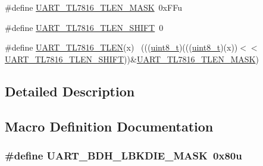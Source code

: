 \begin{DoxyCompactItemize}
\item 
\#define \hyperlink{group___u_a_r_t___register___masks_ga000fb6043015c4cb478d32febfb4a913}{U\+A\+R\+T\+\_\+\+T\+L7816\+\_\+\+T\+L\+E\+N\+\_\+\+M\+A\+SK}~0x\+F\+Fu
\item 
\#define \hyperlink{group___u_a_r_t___register___masks_gaafcee96c5728fbbbc56c3b2ea55bd753}{U\+A\+R\+T\+\_\+\+T\+L7816\+\_\+\+T\+L\+E\+N\+\_\+\+S\+H\+I\+FT}~0
\item 
\#define \hyperlink{group___u_a_r_t___register___masks_ga6665c13844ba2e5f1add9e33a5ae5d66}{U\+A\+R\+T\+\_\+\+T\+L7816\+\_\+\+T\+L\+EN}(x)                                        ~(((\hyperlink{_p_e___types_8h_aba7bc1797add20fe3efdf37ced1182c5}{uint8\+\_\+t})(((\hyperlink{_p_e___types_8h_aba7bc1797add20fe3efdf37ced1182c5}{uint8\+\_\+t})(x))$<$$<$\hyperlink{group___u_a_r_t___register___masks_gaafcee96c5728fbbbc56c3b2ea55bd753}{U\+A\+R\+T\+\_\+\+T\+L7816\+\_\+\+T\+L\+E\+N\+\_\+\+S\+H\+I\+FT}))\&\hyperlink{group___u_a_r_t___register___masks_ga000fb6043015c4cb478d32febfb4a913}{U\+A\+R\+T\+\_\+\+T\+L7816\+\_\+\+T\+L\+E\+N\+\_\+\+M\+A\+SK})
\end{DoxyCompactItemize}


\subsection{Detailed Description}


\subsection{Macro Definition Documentation}
\subsubsection[{\texorpdfstring{U\+A\+R\+T\+\_\+\+B\+D\+H\+\_\+\+L\+B\+K\+D\+I\+E\+\_\+\+M\+A\+SK}{UART_BDH_LBKDIE_MASK}}]{\setlength{\rightskip}{0pt plus 5cm}\#define U\+A\+R\+T\+\_\+\+B\+D\+H\+\_\+\+L\+B\+K\+D\+I\+E\+\_\+\+M\+A\+SK~0x80u}\hypertarget{group___u_a_r_t___register___masks_ga88fb29d1cb045a09e851a31c689ef60e}{}\label{group___u_a_r_t___register___masks_ga88fb29d1cb045a09e851a31c689ef60e}


